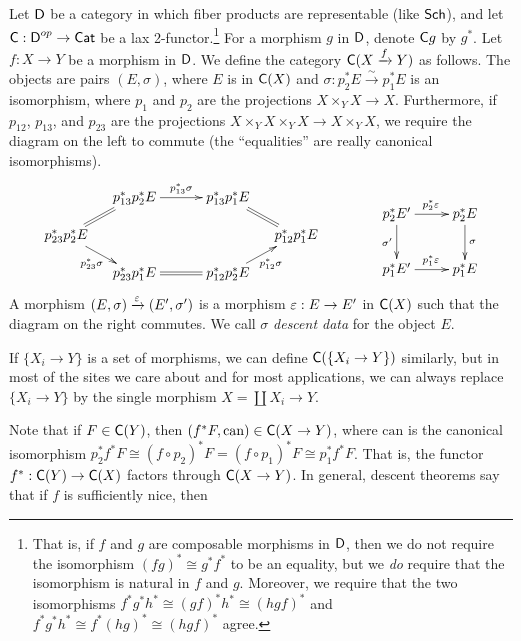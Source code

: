 \begin{definition} \label{lec07D:descent_category}
 Let $\text{\sf D}$ be a category in which fiber products are representable (like $\text{\sf Sch}$), and let $\text{\sf C}:\text{\sf D}^{op}\to \text{\sf Cat}$ be a lax 2-functor.\footnote{That is, if $f$ and $g$ are composable morphisms in $\text{\sf D}$, then we do not require the isomorphism $(fg)^*\cong g^*f^*$ to be an equality, but we \emph{do} require that the isomorphism is natural in $f$ and $g$. Moreover, we require that the two isomorphisms $f^*g^*h^*\cong (gf)^*h^*\cong (hgf)^*$ and $f^*g^*h^*\cong f^*(hg)^*\cong (hgf)^*$ agree.} For a morphism $g$ in $\text{\sf D}$, denote $\text{\sf C} g$ by $g^*$. Let $f:X\to Y$ be a morphism in $\text{\sf D}$. We define the category $\text{\sf C}(X\xrightarrow f Y)$ as follows. The objects are pairs $(E,\sigma)$, where $E$ is in $\text{\sf C}(X)$ and $\sigma:p_2^* E\xrightarrow\sim p_1^* E$ is an isomorphism, where $p_1$ and $p_2$ are the projections $X\times_Y X\to X$. Furthermore, if $p_{12}$, $p_{13}$, and $p_{23}$ are the projections $X\times_Y X\times_Y X\to X\times_Y X$, we require the diagram on the left to commute (the ``equalities'' are really canonical isomorphisms).
 \[\xymatrix @R-1pc @C-1pc {
  & p_{13}^*p_2^*E \ar[rr]^{p_{13}^*\sigma} \ar@{=}[dl] & & p_{13}^*p_1^*E \ar@{=}[dr] & \\
  p_{23}^*p_2^*E \ar[dr]_{p_{23}^*\sigma} & & & & p_{12}^*p_1^*E \\
  & p_{23}^*p_1^*E \ar@{=}[rr] & & p_{12}^*p_2^*E \ar[ur]_{p_{12}^*\sigma}\\
 }\qquad\qquad
 \raisebox{-1pc}{$\xymatrix{
  p_2^* E' \ar[r]^{p_2^* \varepsilon} \ar[d]_{\sigma'} & p_2^* E \ar[d]^{\sigma}\\
  p_1^*E' \ar[r]^{p_1^*\varepsilon} & p_1^* E
 }$}\]
 A morphism $(E,\sigma)\xrightarrow{\varepsilon} (E',\sigma')$ is a morphism $\varepsilon:E\to E'$ in $\text{\sf C}(X)$ such that the diagram on the right commutes. We call $\sigma$ \emph{descent data} for the object $E$.
\end{definition}
 \begin{remark}
   If $\{X_i\to Y\}$ is a set of morphisms, we can define $\text{\sf C}(\{X_i\to Y\})$ similarly,
   but in most of the sites we care about and for most applications, we can always
   replace  $\{X_i\to Y\}$ by the single morphism $X=\coprod X_i\to Y$.
 \end{remark}
 Note that if $F\in \text{\sf C}(Y)$, then $(f^*F,\textrm{can})\in \text{\sf C}(X\to Y)$, where
 $\textrm{can}$ is the canonical isomorphism $p_2^*f^*F\cong (f\circ p_2)^*F=(f\circ
 p_1)^*F\cong p_1^*f^*F$. That is, the functor $f^*:\text{\sf C}(Y)\to \text{\sf C}(X)$ factors through
 $\text{\sf C}(X\to Y)$. In general, descent theorems say that if $f$ is sufficiently nice, then
